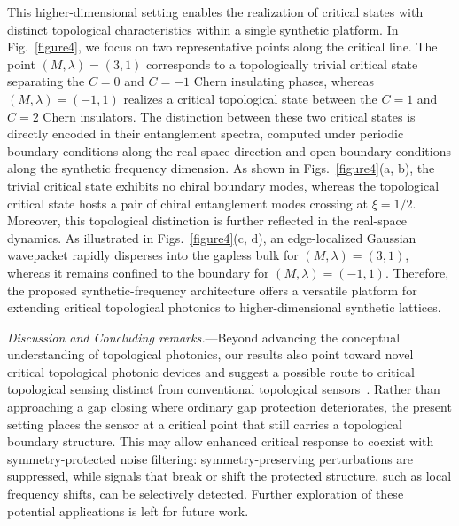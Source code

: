 \documentclass[aps,prl,twocolumn,preprintnumbers,amsmath,amssymb,superscriptaddress,10pt]{revtex4-2}
\begin{document}
This higher-dimensional setting enables the realization of critical states with distinct topological characteristics within a single synthetic platform. In Fig.~\ref{figure4}, we focus on two representative points along the critical line. The point $(M, \lambda)=(3,1)$ corresponds to a topologically trivial critical state separating the $C=0$ and $C=-1$ Chern insulating phases, whereas $(M, \lambda)=(-1,1)$ realizes a critical topological state between the $C=1$ and $C=2$ Chern insulators. The distinction between these two critical states is directly encoded in their entanglement spectra, computed under periodic boundary conditions along the real-space direction and open boundary conditions along the synthetic frequency dimension. As shown in Figs.~\ref{figure4}(a, b), the trivial critical state exhibits no chiral boundary modes, whereas the topological critical state hosts a pair of chiral entanglement modes crossing at $\xi=1/2$. Moreover, this topological distinction is further reflected in the real-space dynamics. As illustrated in Figs.~\ref{figure4}(c, d), an edge-localized Gaussian wavepacket rapidly disperses into the gapless bulk for $(M, \lambda)=(3,1)$, whereas it remains confined to the boundary for $(M, \lambda)=(-1,1)$. Therefore, the proposed synthetic-frequency architecture offers a versatile platform for extending critical topological photonics to higher-dimensional synthetic lattices.


\emph{Discussion and Concluding remarks.}---Beyond advancing the conceptual understanding of topological photonics, our results also point toward novel critical topological photonic devices and suggest a possible route to critical topological sensing distinct from conventional topological sensors~\cite{PhysRevLett.129.090503,xuepeng2026prl}.  Rather than approaching a gap closing where ordinary gap protection deteriorates, the present setting places the sensor at a critical point that still carries a topological boundary structure.  This may allow enhanced critical response to coexist with symmetry-protected noise filtering: symmetry-preserving perturbations are suppressed, while signals that break or shift the protected structure, such as local frequency shifts, can be selectively detected. Further exploration of these potential applications is left for future work. 
\end{document}
